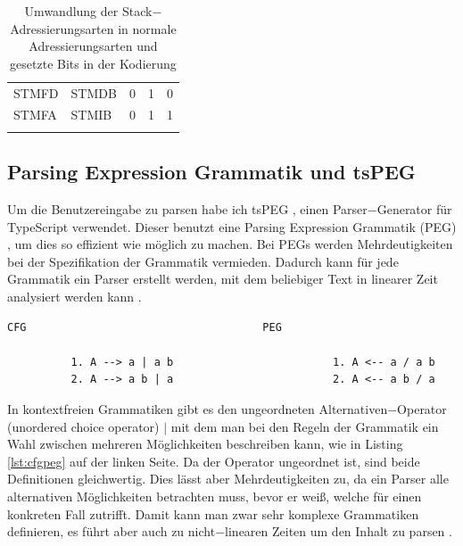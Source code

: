 \documentclass[a4paper, 11pt, onecolumn]{article}
\begin{document}
\begin{table}[!htb]
\begin{tabular}{llccc}
STMFD                           & STMDB                              & 0                                    & 1                                    & 0                                    \\ \arrayrulecolor[gray]{.7}\hline
STMFA                           & STMIB                              & 0                                    & 1                                    & 1                                    \\ \arrayrulecolor{black}\hline
\end{tabular}
\caption[Alternative Adressierungsarten LDM/STM]{Umwandlung der Stack$-$Adressierungsarten in normale Adressierungsarten und gesetzte Bits in der Kodierung \cite{arm:2005}}
\end{table}

\subsection{Parsing Expression Grammatik und tsPEG}\label{sec:peg}

Um die Benutzereingabe zu parsen habe ich tsPEG \cite{tspeg}, einen Parser$-$Generator für TypeScript \cite{typescript} verwendet. Dieser benutzt eine Parsing Expression Grammatik (PEG) \cite{peg}, um dies so effizient wie möglich zu machen. Bei PEGs werden Mehrdeutigkeiten bei der Spezifikation der Grammatik vermieden. Dadurch kann für jede Grammatik ein Parser erstellt werden, mit dem beliebiger Text in linearer Zeit analysiert werden kann \cite{peg}.\\

\begin{lstlisting}[basicstyle=\ttfamily\footnotesize, backgroundcolor=\color{backcolour}, caption={[Definition einer Grammatik bei CFGs und PEGs]Definition einer Grammatik bei kontextfreien Grammatiken (links) und Parsing Expression Grammatiken (rechts) \cite{peg}},captionpos=b, label={lst:cfgpeg}]
                 CFG                                     PEG
             
          1. A --> a | a b                         1. A <-- a / a b
          2. A --> a b | a                         2. A <-- a b / a
\end{lstlisting}

In kontextfreien Grammatiken gibt es den ungeordneten Alternativen$-$Operator (unordered choice operator) $\mid$ mit dem man bei den Regeln der Grammatik ein Wahl zwischen mehreren Möglichkeiten beschreiben kann, wie in Listing \ref{lst:cfgpeg} auf der linken Seite. Da der Operator ungeordnet ist, sind beide Definitionen gleichwertig. Dies lässt aber Mehrdeutigkeiten zu, da ein Parser alle alternativen Möglichkeiten betrachten muss, bevor er weiß, welche für einen konkreten Fall zutrifft. Damit kann man zwar sehr komplexe Grammatiken definieren, es führt aber auch zu nicht$-$linearen Zeiten um den Inhalt zu parsen \cite{cfg}.
\end{document}
